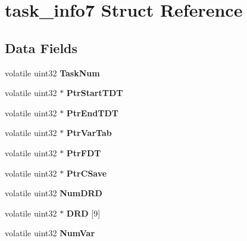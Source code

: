 \hypertarget{structtask__info7}{}\section{task\+\_\+info7 Struct Reference}
\label{structtask__info7}
\subsection*{Data Fields}
\begin{DoxyCompactItemize}
\item 
\mbox{\label{structtask__info7_a4047ccb0b7277d44f221278f4bf15d4c}} 
volatile uint32 {\bfseries Task\+Num}
\item 
\mbox{\label{structtask__info7_aad53c8c49353c57f06ba9eb7c5b0f204}} 
volatile uint32 $\ast$ {\bfseries Ptr\+Start\+T\+DT}
\item 
\mbox{\label{structtask__info7_a3f1bf275446d670ee892e95d9ffec92a}} 
volatile uint32 $\ast$ {\bfseries Ptr\+End\+T\+DT}
\item 
\mbox{\label{structtask__info7_aaca0b1ea6a487a68e2ff889ad8fe3f62}} 
volatile uint32 $\ast$ {\bfseries Ptr\+Var\+Tab}
\item 
\mbox{\label{structtask__info7_ae9339bf485a07a0a10cef0326ff7eff6}} 
volatile uint32 $\ast$ {\bfseries Ptr\+F\+DT}
\item 
\mbox{\label{structtask__info7_a1b7eb22bcd14c79efdb9aa9e5617c56f}} 
volatile uint32 $\ast$ {\bfseries Ptr\+C\+Save}
\item 
\mbox{\label{structtask__info7_ac5df07072b8228b5ba608eae590b3ae0}} 
volatile uint32 {\bfseries Num\+D\+RD}
\item 
\mbox{\label{structtask__info7_abcf07d5e6710f59e390c7413b4fd1be8}} 
volatile uint32 $\ast$ {\bfseries D\+RD} \mbox{[}9\mbox{]}
\item 
\mbox{\label{structtask__info7_a06f9ed8be043326706d7bcedfd84be30}} 
volatile uint32 {\bfseries Num\+Var}
\item 

\end{DoxyCompactItemize}
